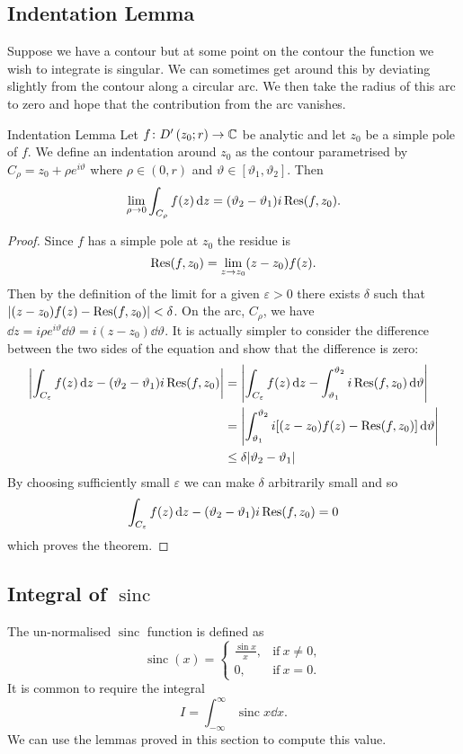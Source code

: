 \documentclass{article}
\DeclareMathOperator{\sinc}{sinc}
\newcommand{\discPunctured}[2]{D'\left({#1}; {#2}\right)}
\begin{document}
    \subsection{Indentation Lemma}
    Suppose we have a contour but at some point on the contour the function we wish to integrate is singular.
    We can sometimes get around this by deviating slightly from the contour along a circular arc.
    We then take the radius of this arc to zero and hope that the contribution from the arc vanishes.
    \begin{lemma}{Indentation Lemma}{}
        Let \(f\colon\discPunctured{z_0}{r}\to\complex\) be analytic and let \(z_0\) be a simple pole of \(f\).
        We define an indentation around \(z_0\) as the contour parametrised by \(C_{\rho} = z_0 + \rho e^{i\vartheta}\) where \(\rho \in (0, r)\) and \(\vartheta \in [\vartheta_{1}, \vartheta_{2}]\).
        Then
        \[\lim_{\rho\to 0} \int_{C_{\rho}} f(z) \dd{z} = (\vartheta_{2} - \vartheta_1) i \Res(f, z_0).\]
    \end{lemma}
    \begin{proof}
        Since \(f\) has a simple pole at \(z_{0}\) the residue is
        \[\Res(f, z_0) = \lim_{z\to z_0} (z - z_0)f(z).\]
        Then by the definition of the limit for a given \(\varepsilon > 0\) there exists \(\delta\) such that \(\abs{(z - z_0)f(z) - \Res(f, z_0)} < \delta\).
        On the arc, \(C_{\rho}\), we have \(\dd{z} = i\rho e^{i\vartheta} \dd{\vartheta} = i(z - z_0)\dd{\vartheta}\).
        It is actually simpler to consider the difference between the two sides of the equation and show that the difference is zero:
        \begin{align*}
            \abs{\int_{C_{\varepsilon}} f(z) \dd{z} - (\vartheta_2 - \vartheta_1)i\Res(f, z_0)} &= \abs{\int_{C_\varepsilon} f(z) \dd{z} - \int_{\vartheta_1}^{\vartheta_2} i\Res(f, z_0) \dd{\vartheta}}\\
            &= \abs{\int_{\vartheta_1}^{\vartheta_2} i[(z - z_0)f(z) - \Res(f, z_0)]\dd{\vartheta}}\\
            &\le \delta \abs{\vartheta_2 - \vartheta_1}
        \end{align*}
        By choosing sufficiently small \(\varepsilon\) we can make \(\delta\) arbitrarily small and so
        \[\int_{C_{\varepsilon}} f(z) \dd{z} - (\vartheta_2 - \vartheta_1)i\Res(f, z_0) = 0\]
        which proves the theorem.
    \end{proof}
    
    \subsection{Integral of \texorpdfstring{\(\sinc\)}{sinc}}
    The un-normalised \(\sinc\) function is defined as
    \[
        \sinc(x) = 
        \begin{cases}
            \frac{\sin x}{x}, & \text{if}~x\ne 0,\\
            0, & \text{if}~x = 0.
        \end{cases}
    \]
    It is common to require the integral
    \[I = \int_{-\infty}^{\infty} \sinc x \dd{x}.\]
    We can use the lemmas proved in this section to compute this value.
    
\end{document}
